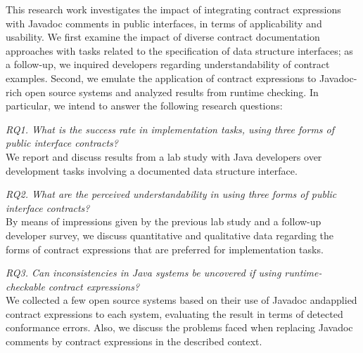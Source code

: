 This research work investigates the impact of integrating contract expressions with Javadoc comments in public interfaces, in terms of applicability and usability. We first examine the impact of diverse contract documentation approaches with tasks related to the specification of data structure interfaces; as a follow-up, we inquired developers regarding understandability of contract examples. Second, we emulate the application of contract expressions to Javadoc-rich open source systems and analyzed results from runtime checking. In particular, we intend to answer the following research questions:  

\noindent\emph{RQ1. What is the success rate in implementation tasks, using three forms of public interface contracts?}\\
We report and discuss results from a lab study with Java developers over development tasks involving a documented data structure interface.

  
\noindent\emph{RQ2. What are the perceived understandability in using three forms of public interface contracts?}\\
By means of impressions given by the previous lab study and a follow-up developer survey, we discuss quantitative and qualitative data regarding the forms of contract expressions that are preferred for implementation tasks.


\noindent\emph{RQ3. Can inconsistencies in Java systems be uncovered if using runtime-checkable contract expressions?}\\
We collected a few open source systems based on their use of Javadoc andapplied contract expressions
to each system, evaluating the result in terms of detected conformance errors. Also, we discuss the problems faced when replacing Javadoc comments by contract expressions in the described context.

